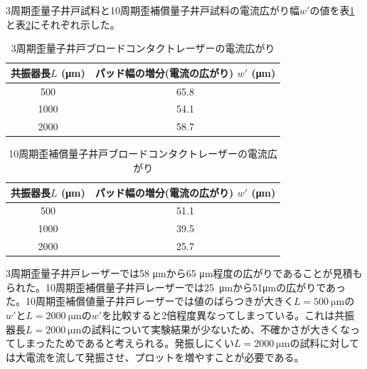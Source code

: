 3周期歪量子井戸試料と10周期歪補償量子井戸試料の電流広がり幅$w'$の値を表\ref{table:table_3QW_broadcontact_w_eff}と表\ref{table:table_10QW_broadcontact_w_eff}にそれぞれ示した。
\begin{table}[h]
  \caption{3周期歪量子井戸ブロードコンタクトレーザーの電流広がり}
  \label{table:table_3QW_broadcontact_w_eff}
  \centering
  \begin{tabular}{cc}
    \hline
    共振器長$L$ (\si{\micro\metre})  & パッド幅の増分(電流の広がり) $w'$ (\si{\micro\metre})   \\
    \hline \hline
     500 & 65.8  \\
    1000  & 54.1 \\
    2000  & 58.7 \\ 
    \hline
  \end{tabular}
\end{table}

\begin{table}[h]
  \caption{10周期歪補償量子井戸ブロードコンタクトレーザーの電流広がり}
  \label{table:table_10QW_broadcontact_w_eff}
  \centering
  \begin{tabular}{cc}
    \hline
    共振器長$L$ (\si{\micro\metre})  & パッド幅の増分(電流の広がり) $w'$ (\si{\micro\metre})   \\
    \hline \hline
     500 & 51.1  \\
    1000  & 39.5 \\
    2000  & 25.7 \\ 
    \hline
  \end{tabular}
\end{table}

3周期歪量子井戸レーザーでは58 \si{\micro\metre}から65 \si{\micro\metre}程度の広がりであることが見積もられた。10周期歪補償量子井戸レーザーでは25\ \si{ \micro\metre}から51\si{ \micro\metre}の広がりであった。10周期歪補償値量子井戸レーザーでは値のばらつきが大きく$L=500 \ \si{\micro\metre}$の$w'$と$L=2000 \ \si{\micro\metre}$の$w'$を比較すると2倍程度異なってしまっている。これは共振器長$L=2000\ \si{\micro\metre}$の試料について実験結果が少ないため、不確かさが大きくなってしまったためであると考えられる。発振しにくい$L=2000 \ \si{\micro\metre}$の試料に対しては大電流を流して発振させ、プロットを増やすことが必要である。


